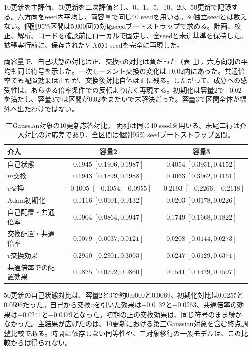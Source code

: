 10更新を主評価、50更新を二次評価とし、0、1、5、10、20、50更新で記録する。六方向をseed内平均し、両容量で同じ40 seedを用いる。80独立seedとは数えない。個別95\%区間は5,000回の対応seedブートストラップで求める。計画、校正、解析、コードを確認前にローカルで固定し、全seedと未達基準を保持した。拡張実行前に、保存されたV-Aの1 seedを完全に再現した。

両容量で、自己状態の対比は正、交換$v$の対比は負だった（表~\ref{tab:vb}）。六方向別の平均も同じ符号を示した。一次モーメント交換の変化は$\pm0.02$内にあった。共通倍率でも配置効果は正だが、交換後対比自体は正に残る。したがって、成分への感受性は、あらゆる倍率条件での反転より広く再現する。初期化は容量2で$\pm0.02$を満たし、容量3では区間が0.02をまたいで未解決だった。容量3で区間全体が幅外へ出たわけではない。
\begin{table}[ht]
\centering\small
\caption{三Gaussian対象の10更新応答対比。 両列は同じ40 seedを用いる。末尾二行は介入対比の対応差であり、全区間は個別95\% seedブートストラップ区間。}
\label{tab:vb}
\begin{tabular}{lcc}
\toprule
介入 & 容量2 & 容量3\\
\midrule
自己状態 & $0.1945\;[0.1906,0.1987]$ & $0.4054\;[0.3951,0.4152]$\\
$m$交換 & $0.1943\;[0.1899,0.1988]$ & $0.4063\;[0.3962,0.4161]$\\
$v$交換 & $-0.1005\;[-0.1054,-0.0955]$ & $-0.2193\;[-0.2266,-0.2118]$\\
Adam初期化 & $0.0116\;[0.0101,0.0132]$ & $0.0203\;[0.0178,0.0226]$\\
自己配置・共通倍率 & $0.0904\;[0.0864,0.0947]$ & $0.1749\;[0.1668,0.1822]$\\
交換配置・共通倍率 & $0.0079\;[0.0037,0.0121]$ & $0.0208\;[0.0144,0.0273]$\\
\midrule
$v$交換効果 & $0.2950\;[0.2901,0.3003]$ & $0.6247\;[0.6129,0.6371]$\\
共通倍率での配置効果 & $0.0825\;[0.0792,0.0860]$ & $0.1541\;[0.1479,0.1597]$\\
\bottomrule
\end{tabular}
\end{table}

50更新の自己状態対比は、容量2と3で約0.0000と0.0069、初期化対比は0.0255と0.0596だった。自己から交換$v$を引いた効果は$-0.0132$と$-0.0263$、共通倍率の効果は$-0.0241$と$-0.0479$となった。初期の正の交換効果は、同じ符号のまま続かなかった。主結果が広げたのは、10更新における第三Gaussian対象を含む終点調整比較である。時間に依存しない同等性や、三対象移行の一般モデルは、この比較からは得られない。

